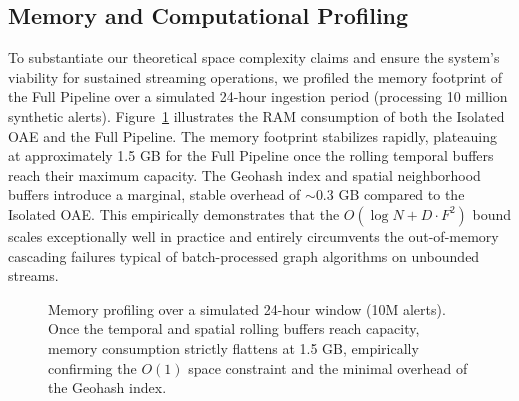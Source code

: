 \documentclass[10pt,journal,compsoc]{IEEEtran}
\begin{document}
\subsection{Memory and Computational Profiling}
To substantiate our theoretical space complexity claims and ensure the system's viability for sustained streaming operations, we profiled the memory footprint of the Full Pipeline over a simulated 24-hour ingestion period (processing 10 million synthetic alerts). Figure~\ref{fig:memory_profile} illustrates the RAM consumption of both the Isolated OAE and the Full Pipeline. The memory footprint stabilizes rapidly, plateauing at approximately 1.5 GB for the Full Pipeline once the rolling temporal buffers reach their maximum capacity. The Geohash index and spatial neighborhood buffers introduce a marginal, stable overhead of $\sim$0.3 GB compared to the Isolated OAE. This empirically demonstrates that the $O(\log N + D \cdot F^2)$ bound scales exceptionally well in practice and entirely circumvents the out-of-memory cascading failures typical of batch-processed graph algorithms on unbounded streams.

\begin{figure}[htbp]
    \centering
    \caption{Memory profiling over a simulated 24-hour window (10M alerts). Once the temporal and spatial rolling buffers reach capacity, memory consumption strictly flattens at 1.5 GB, empirically confirming the $O(1)$ space constraint and the minimal overhead of the Geohash index.}
    \label{fig:memory_profile}
\end{figure}
\end{document}
